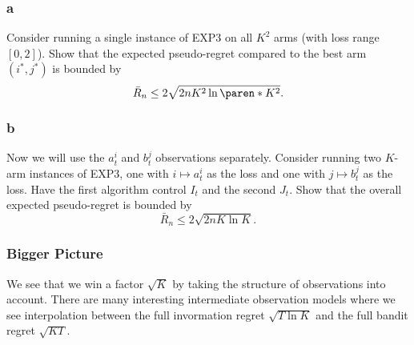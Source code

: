 \documentclass[10pt, a4paper, twoside]{amsart}
\theoremstyle{plain}
\DeclarePairedDelimiter\paren()
\begin{document}
\subsubsection*{a} Consider running a single instance of EXP$3$ on all $K^2$ arms (with loss range $[0,2]$). Show that the expected pseudo-regret compared to the best arm $(i^*, j^*)$ is bounded by
\begin{equation*}
    \bar{R}_n \leq 2 \sqrt{2nK^2\ln\paren*{K^2}}.
\end{equation*}
\subsubsection*{b} Now we will use the $a_t^i$ and $b_t^j$ observations separately. Consider running two $K$-arm instances of EXP$3$, one with $i \mapsto a_t^i$ as the loss and one with $j \mapsto b_t^j$ as the loss. Have the first algorithm control $I_t$ and the second $J_t$. Show that the overall expected pseudo-regret is bounded by 
\begin{equation*}
    \bar{R}_n \leq 2 \sqrt{2nK\ln K}.
\end{equation*}
\subsubsection*{Bigger Picture} We see that we win a factor $\sqrt{K}$ by taking the structure of observations into account. There are many interesting intermediate observation models where we see interpolation between the full invormation regret $\sqrt{T \ln K}$ and the full bandit regret $\sqrt{KT}$.
\end{document}
